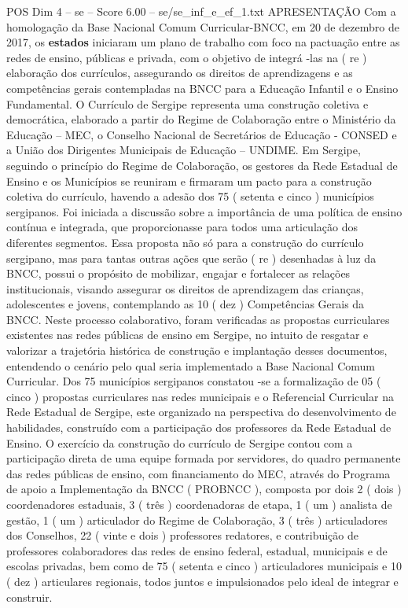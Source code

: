 \begin{textsample}{POS Dim 4 – se – Score 6.00 – se/se\_inf\_e\_ef\_1.txt}  \label{ex:f4_pos_150}
APRESENTAÇÃO Com a homologação da Base Nacional Comum Curricular-BNCC, em 20 de dezembro de 2017, os \textbf{estados} iniciaram um plano de trabalho com foco na pactuação entre as redes de ensino, públicas e privada, com o objetivo de integrá -las na ( re ) elaboração dos currículos, assegurando os direitos de aprendizagens e as competências gerais contempladas na BNCC para a Educação Infantil e o Ensino Fundamental.
O Currículo de Sergipe representa uma construção coletiva e democrática, elaborado a partir do Regime de Colaboração entre o Ministério da Educação – MEC, o Conselho Nacional de Secretários de Educação - CONSED e a União dos Dirigentes Municipais de Educação – UNDIME.
Em Sergipe, seguindo o princípio do Regime de Colaboração, os gestores da Rede Estadual de Ensino e os Municípios se reuniram e firmaram um pacto para a construção coletiva do currículo, havendo a adesão dos 75 ( setenta e cinco ) municípios sergipanos.
Foi iniciada a discussão sobre a importância de uma política de ensino contínua e integrada, que proporcionasse para todos uma articulação dos diferentes segmentos.
Essa proposta não só para a construção do currículo sergipano, mas para tantas outras ações que serão ( re ) desenhadas à luz da BNCC, possui o propósito de mobilizar, engajar e fortalecer as relações institucionais, visando assegurar os direitos de aprendizagem das crianças, adolescentes e jovens, contemplando as 10 ( dez ) Competências Gerais da BNCC.
Neste processo colaborativo, foram verificadas as propostas curriculares existentes nas redes públicas de ensino em Sergipe, no intuito de resgatar e valorizar a trajetória histórica de construção e implantação desses documentos, entendendo o cenário pelo qual seria implementado a Base Nacional Comum Curricular.
Dos 75 municípios sergipanos constatou -se a formalização de 05 ( cinco ) propostas curriculares nas redes municipais e o Referencial Curricular na Rede Estadual de Sergipe, este organizado na perspectiva do desenvolvimento de habilidades, construído com a participação dos professores da Rede Estadual de Ensino.
O exercício da construção do currículo de Sergipe contou com a participação direta de uma equipe formada por servidores, do quadro permanente das redes públicas de ensino, com financiamento do MEC, através do Programa de apoio a Implementação da BNCC ( PROBNCC ), composta por dois 2 ( dois ) coordenadores estaduais, 3 ( três ) coordenadoras de etapa, 1 ( um ) analista de gestão, 1 ( um ) articulador do Regime de Colaboração, 3 ( três ) articuladores dos Conselhos, 22 ( vinte e dois ) professores redatores, e contribuição de professores colaboradores das redes de ensino federal, estadual, municipais e de escolas privadas, bem como de 75 ( setenta e cinco ) articuladores municipais e 10 ( dez ) articulares regionais, todos juntos e impulsionados pelo ideal de integrar e construir.

\end{textsample}
